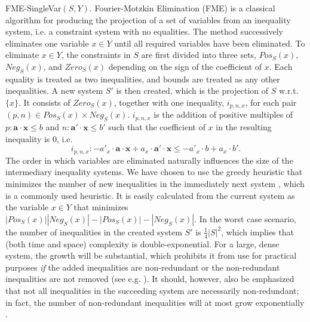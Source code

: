 \documentclass{llncs}
\newcommand{\Pos}{\mathit{Pos}}
\newcommand{\Neg}{\mathit{Neg}}
\newcommand{\mi}{\mathit}
\newcommand{\ve}{\mathbf}
\begin{document}
{\sc FME-SingleVar}$(S,Y)$. Fourier-Motzkin Elimination (FME) is a classical algorithm for producing the projection of a set of variables from an inequality system, i.e. a constraint system with no equalities. The method successively eliminates one variable $x\in Y$ until all required variables have been eliminated. To eliminate $x\in Y$, the constraints in $S$ are first divided into three sets, $\Pos_S(x)$, $\Neg_S(x)$, and $\mi{Zero}_S(x)$ depending on the sign of the coefficient of $x$. Each equality is treated as two inequalities, and bounds are treated as any other inequalities. 
A new system $S'$ is then created, which is the projection of $S$ w.r.t. $\{x\}$. It consists of $\mi{Zero}_S(x)$, together with one inequality, $i_{p,n,x}$, for each pair $(p,n)\in \Pos_S(x)\times \Neg_S(x)$. $i_{p,n,x}$ is the addition of positive multiples of $p:\ve{a}\cdot\ve{x} \leq b$ and $n:\ve{a}'\cdot\ve{x} \leq b'$ such that the coefficient of $x$ in the resulting inequality is $0$, i.e.
\[
i_{p,n,x}: -a'_x\cdot \ve{a}\cdot\ve{x} + a_x\cdot \ve{a}'\cdot\ve{x} \leq -a'_x\cdot b + a_x\cdot b'.
\]
The order in which variables are eliminated naturally influences the size of the intermediary inequality systems. We have chosen to use the greedy heuristic {that minimizes the number of new inequalities in the immediately next system \cite{duffin74}}, which is a commonly used heuristic. It is easily calculated from the current system as the variable $x\in Y$ that minimizes $|\Pos_S(x)||\Neg_S(x)| - |\Pos_S(x)|-|\Neg_S(x)|$.  In the worst case scenario, %
the number of inequalities in the created system $S'$ is $\frac{1}{4}|S|^2$, which implies that (both time and space) complexity is double-exponential. For a large, dense system, the growth will be substantial, which prohibits it from use for practical purposes \emph{if} the added inequalities are non-redundant or the non-redundant inequalities are not removed ({see e.g. \cite{lukatskii08}}). It should, however, also be emphasized that not all inequalities in the succeeding system are necessarily non-redundant; in fact, the number of non-redundant inequalities will at most grow exponentially \cite{monniaux10}.
\end{document}
